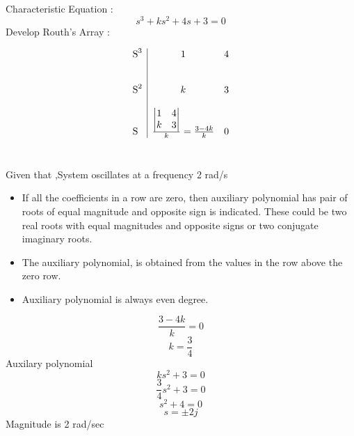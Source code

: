 \documentclass{beamer}
\begin{document}
\begin{frame}
Characteristic Equation :\\
$$s^3+ks^2+4s+3 = 0$$
Develop Routh's Array :\\
\begin{centre}
\[ \begin{array}{l|c  r}

\mbox S^3 & 1 & 4 \\~\\~\\
\mbox S^2 & k & 3 \\~\\
\mbox S & \frac{\begin{vmatrix}
1 & 4 \\ 
k & 3 \\  
\end{vmatrix}}{k} = \frac{3 - 4k}{k} & 0 \end{array}\] 
\\
\end{centre}
\end{frame}
\begin{frame}
 Given that ,System oscillates at a frequency 2 rad/s \\
\begin{itemize}

   \item If all the coefficients in a row are zero, then auxiliary polynomial has pair of roots of equal magnitude and opposite sign is indicated. These could be two real roots with equal magnitudes and opposite signs or two conjugate imaginary roots.
   \item The auxiliary polynomial, is obtained from the values in the row above the zero row.
   \item Auxiliary polynomial is always even degree.
\end{itemize}

\end{frame}
\begin{frame}
\begin{centre}

$$
\frac{3 - 4k}{k} = 0
$$
$$ k = \frac{3}{4}$$
Auxilary polynomial\\
$$
 ks^2 +3 = 0
$$
$$
 \frac{3}{4}s^2 +3 = 0
$$
$$
 s^2 + 4 =0 
$$
$$  s = \pm 2j$$
Magnitude is 2 rad/sec 


\end{centre}
    
\end{frame}
\end{document}
